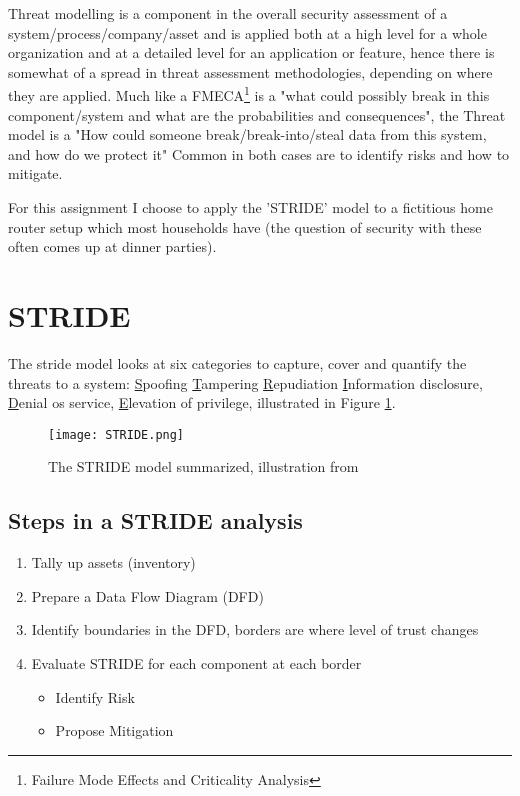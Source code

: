 \documentclass[
	letterpaper, %
	10pt, %
	unnumberedsections, %
	twoside, %
]{APAAssignment}
\begin{document}
Threat modelling is a component in the overall security assessment of a system/process/company/asset and is applied both at a high level for a whole organization and at a detailed level for an application or feature, hence there is somewhat of a spread in threat assessment methodologies\cite{12Methods}, depending on where they are applied. Much like a FMECA\footnote{Failure Mode Effects and Criticality Analysis} is a "what could possibly break in this component/system and what are the probabilities and consequences", the Threat model is a "How could someone break/break-into/steal data from this system, and how do we protect it" Common in both cases are to identify risks and how to mitigate.

For this assignment I choose to apply the 'STRIDE' model to a fictitious home router setup which most households have (the question of security with these often comes up at dinner parties).

\section{STRIDE}

The stride model looks at six categories to capture, cover and quantify the threats to a system: \underline{S}poofing \underline{T}ampering \underline{R}epudiation \underline{I}nformation disclosure, \underline{D}enial os service, \underline{E}levation of privilege, illustrated in Figure \ref{fig:STRIDE}. 



\begin{figure}[!htp] %
	\centering
	\texttt{[image: STRIDE.png]}
	\caption{The STRIDE model summarized, illustration from \cite{STRIDE_For_pay_Medium}}
	\label{fig:STRIDE}
\end{figure}

\subsection{Steps in a STRIDE analysis}

\begin{spacing}{1}
\begin{enumerate}
	\item Tally up assets (inventory)
	\item Prepare a Data Flow Diagram (DFD)
	\item Identify boundaries in the DFD, borders are where level of trust changes
	\item Evaluate STRIDE for each component at each border
	\begin{itemize}
		\item Identify Risk 
		\item Propose Mitigation
	\end{itemize} 
\end{enumerate}
\end{spacing}
\end{document}
